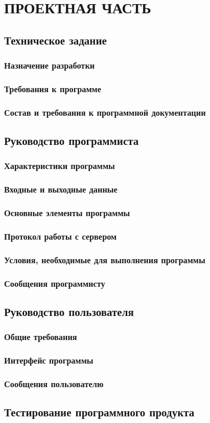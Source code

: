 \newpage
\section{ПРОЕКТНАЯ ЧАСТЬ}

\subsection{Техническое задание}
\subsubsection{Назначение разработки}
\subsubsection{Требования к программе}
\subsubsection{Состав и требования к программной документации}

\subsection{Руководство программиста}
\subsubsection{Характеристики программы}
\subsubsection{Входные и выходные данные}
\subsubsection{Основные элементы программы}
\subsubsection{Протокол работы с сервером}
\subsubsection{Условия, необходимые для выполнения программы}
\subsubsection{Сообщения программисту}

\subsection{Руководство пользователя}
\subsubsection{Общие требования}
\subsubsection{Интерфейс программы}
\subsubsection{Сообщения пользователю}

\subsection{Тестирование программного продукта}
